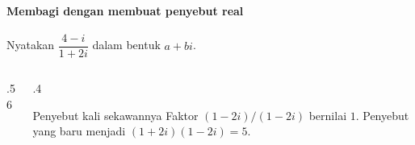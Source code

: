 \documentclass{../../kalkulus-ppt}
\begin{document}
\begin{frame}
    \frametitle{\insertsection}
    \framesubtitle{Membagi dengan membuat penyebut real}
    \begin{contoh}
        Nyatakan $\dfrac{4-i}{1+2i}$ dalam bentuk $a+bi$.
    \end{contoh}
    \begin{columns}[c,onlytextwidth]
        \begin{column}{.56\textwidth}
        \end{column}
        \begin{column}{.4\textwidth}
            \begin{block}{Penyebut kali sekawannya}
                Faktor $(1-2i)/(1-2i)$ bernilai $1$. Penyebut yang baru menjadi
                $(1+2i)(1-2i)=5$.
            \end{block}
        \end{column}
    \end{columns}
\end{frame}
\end{document}
